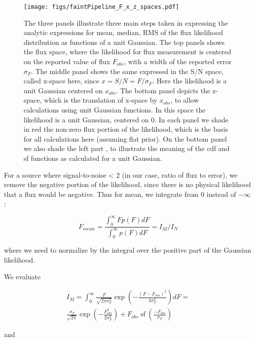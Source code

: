 \documentclass[fleqn,usenatbib]{mnras}  %
\DeclareMathOperator\sf{sf}
\begin{document}
\begin{figure}
 \texttt{[image: figs/faintPipeline\_F\_x\_z\_spaces.pdf]}
 \caption{The three panels illustrate three main steps taken in expressing  the analytic expressions for mean, median, RMS of the flux  likelihood distribution as functions of a unit Gaussian. The top panels shows the flux space, where  the  likelihood for flux measurement is centered on the  reported value  of flux  $F_{obs}$, with a width of the reported error $\sigma_{F}$. The middle panel shows the same expressed in the S/N space, called x-space here,  since  $x = S/N =  F / \sigma_{F} $.  Here the likelihood is a unit Gaussian centered on $x_{obs}$.   The bottom panel depicts the z-space, which is the translation of x-space by $x_{obs}$, to allow calculations using unit Gaussian functions. In this space the likelihood is a unit Gaussian, centered on 0. In each panel we shade in red the non-zero flux portion of the likelihood, which is the basis for all calculations here (assuming flat prior).  On the bottom panel we also shade the left part , to illustrate the meaning of the cdf and sf functions as calculated for a unit Gaussian.  }
 \label{fig:three_panels}
\end{figure}




For a source where signal-to-noise < 2 (in our case, ratio of  flux to error), we remove the negative portion of the likelihood, since there is no physical likelihood that a flux would be negative.
Thus for mean, we integrate from $0$ instead of $-\infty$ : 


\begin{equation}
F_{mean} = \frac{\int _{0} ^ {\infty}{F p(F) dF}}{\int _{0} ^ {\infty}{p(F) dF}} = I_{M} / I_{N}
\end{equation}

where we need to normalize by the integral over the positive part of the Gaussian likelihood. 

We evaluate 

\begin{multline}
I_{M}= \int _{0} ^ {\infty} {\frac{F}{\sqrt{2\pi\sigma_{F}^{2}}} \exp{\left(-\frac{(F-F_{obs})^{2}}{2\sigma_{F}^{2}}\right)} }dF = \\  \frac{\sigma_{F}}{\sqrt{2 \pi}} \exp{\left(- \frac{F_{obs}^{2}}{2\sigma_{F}^{2}} \right)} + F_{obs} \sf{\left( \frac{-F_{obs}}{\sigma_{F}}\right)}
\end{multline}

and 
\end{document}
